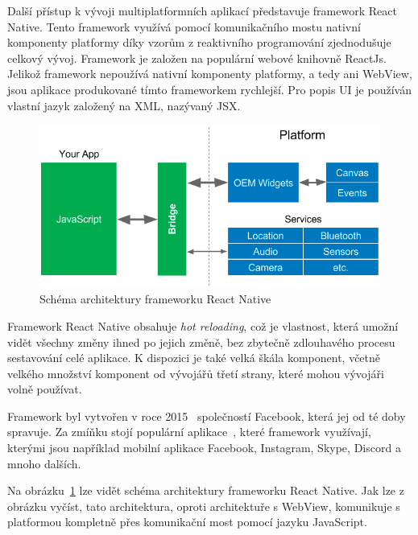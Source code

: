 Další přístup k vývoji multiplatformních aplikací představuje framework
React Native.
Tento framework využívá pomocí komunikačního mostu nativní komponenty platformy
díky vzorům z reaktivního programování zjednodušuje celkový vývoj.
\cite{hackernoon_flutter}
Framework je založen na populární webové knihovně ReactJs.
\cite{dashmagazine_mobile_frameworks}
Jelikož framework nepoužívá nativní komponenty platformy,
a tedy ani WebView,
jsou aplikace produkované tímto frameworkem rychlejší.
Pro popis UI je používán vlastní jazyk založený na XML, nazývaný JSX.

\begin{figure}[ht!]
    \centering
    \includegraphics[width=\linewidth]{assets/technology-research/framework/react_native.png}
    \caption{Schéma architektury frameworku React Native
    ~\cite{hackernoon_flutter}}
    \label{fig:framework_react_native}
\end{figure}

Framework React Native obsahuje \emph{hot reloading},
což je vlastnost,
která umožní vidět všechny změny ihned po jejich změně,
bez zbytečně zdlouhavého procesu sestavování celé aplikace.
K dispozici je také velká škála komponent,
včetně velkého množství komponent od vývojářů třetí strany, 
které mohou vývojáři volně používat.
\cite{dashmagazine_mobile_frameworks}

Framework byl vytvořen v roce 2015~\cite{hackernoon_flutter}
společností Facebook,
která jej od té doby spravuje.
Za zmíňku stojí populární aplikace~\cite{react_native},
které framework využívají,
kterými jsou například mobilní aplikace Facebook, Instagram, Skype, Discord
a mnoho dalších.

Na obrázku~\ref{fig:framework_react_native} lze vidět schéma architektury
frameworku React Native.
Jak lze z obrázku vyčíst,
tato architektura,
oproti architektuře s WebView,
komunikuje s platformou kompletně přes komunikační most pomocí jazyku
JavaScript.

